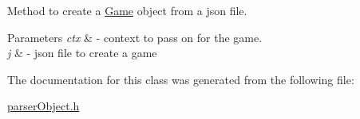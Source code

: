 Method to create a \hyperlink{classGame}{Game} object from a json file. 
\begin{DoxyParams}{Parameters}
{\em ctx} & -\/ context to pass on for the game. \\
\hline
{\em j} & -\/ json file to create a game \\
\hline
\end{DoxyParams}


The documentation for this class was generated from the following file\+:\begin{DoxyCompactItemize}
\item 
\hyperlink{parserObject_8h}{parser\+Object.\+h}\end{DoxyCompactItemize}
